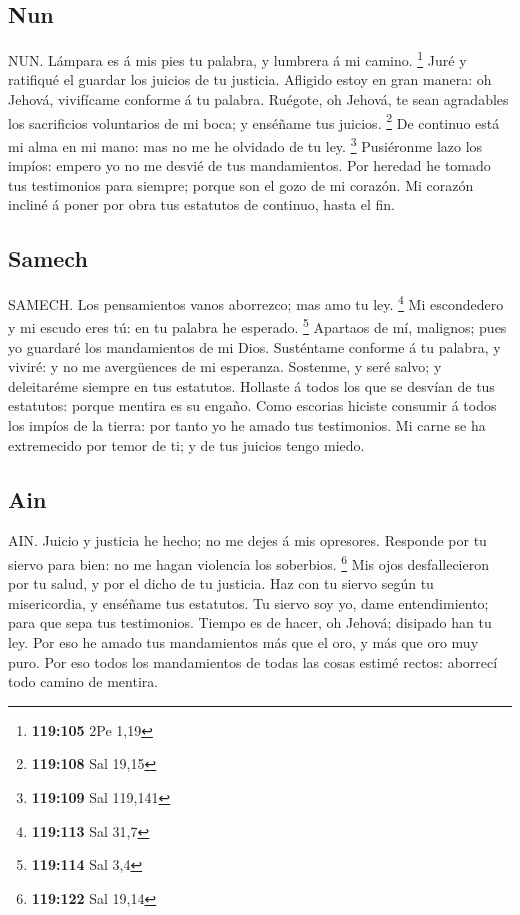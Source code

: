 \hypertarget{nun}{%
\subsection{Nun}\label{nun}}

 NUN. Lámpara es á mis pies tu palabra, y lumbrera á mi
camino. \footnote{\textbf{119:105} 2Pe 1,19}  Juré y
ratifiqué el guardar los juicios de tu justicia.  Afligido
estoy en gran manera: oh Jehová, vivifícame conforme á tu palabra.
 Ruégote, oh Jehová, te sean agradables los sacrificios
voluntarios de mi boca; y enséñame tus juicios. \footnote{\textbf{119:108}
  Sal 19,15}  De continuo está mi alma en mi mano: mas no
me he olvidado de tu ley. \footnote{\textbf{119:109} Sal 119,141}
 Pusiéronme lazo los impíos: empero yo no me desvié de tus
mandamientos.  Por heredad he tomado tus testimonios para
siempre; porque son el gozo de mi corazón.  Mi corazón
incliné á poner por obra tus estatutos de continuo, hasta el fin.

\hypertarget{samech}{%
\subsection{Samech}\label{samech}}

 SAMECH. Los pensamientos vanos aborrezco; mas amo tu ley.
\footnote{\textbf{119:113} Sal 31,7}  Mi escondedero y mi
escudo eres tú: en tu palabra he esperado. \footnote{\textbf{119:114}
  Sal 3,4}  Apartaos de mí, malignos; pues yo guardaré los
mandamientos de mi Dios.  Susténtame conforme á tu
palabra, y viviré: y no me avergüences de mi esperanza. 
Sostenme, y seré salvo; y deleitaréme siempre en tus estatutos.
 Hollaste á todos los que se desvían de tus estatutos:
porque mentira es su engaño.  Como escorias hiciste
consumir á todos los impíos de la tierra: por tanto yo he amado tus
testimonios.  Mi carne se ha extremecido por temor de ti;
y de tus juicios tengo miedo.

\hypertarget{ain}{%
\subsection{Ain}\label{ain}}

 AIN. Juicio y justicia he hecho; no me dejes á mis
opresores.  Responde por tu siervo para bien: no me hagan
violencia los soberbios. \footnote{\textbf{119:122} Sal 19,14}
 Mis ojos desfallecieron por tu salud, y por el dicho de
tu justicia.  Haz con tu siervo según tu misericordia, y
enséñame tus estatutos.  Tu siervo soy yo, dame
entendimiento; para que sepa tus testimonios.  Tiempo es
de hacer, oh Jehová; disipado han tu ley.  Por eso he
amado tus mandamientos más que el oro, y más que oro muy puro.
 Por eso todos los mandamientos de todas las cosas estimé
rectos: aborrecí todo camino de mentira.

